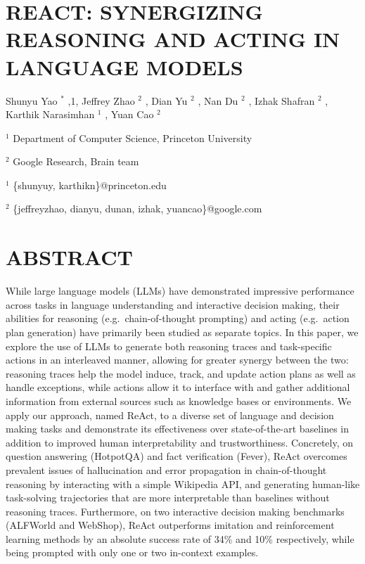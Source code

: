 \documentclass[
]{article}
\author{}
\date{}
\begin{document}
\section{REACT: SYNERGIZING REASONING AND ACTING IN LANGUAGE
MODELS}\label{react-synergizing-reasoning-and-acting-in-language-models}

Shunyu Yao \(^{*}\) ,1, Jeffrey Zhao \(^{2}\) , Dian Yu \(^{2}\) , Nan
Du \(^{2}\) , Izhak Shafran \(^{2}\) , Karthik Narasimhan \(^{1}\) ,
Yuan Cao \(^{2}\)

\(^{1}\) Department of Computer Science, Princeton University

\(^{2}\) Google Research, Brain team

\(^{1}\) \{shunyuy, karthikn\}@princeton.edu

\(^{2}\) \{jeffreyzhao, dianyu, dunan, izhak, yuancao\}@google.com

\section{ABSTRACT}\label{abstract}

While large language models (LLMs) have demonstrated impressive
performance across tasks in language understanding and interactive
decision making, their abilities for reasoning (e.g.~chain-of-thought
prompting) and acting (e.g.~action plan generation) have primarily been
studied as separate topics. In this paper, we explore the use of LLMs to
generate both reasoning traces and task-specific actions in an
interleaved manner, allowing for greater synergy between the two:
reasoning traces help the model induce, track, and update action plans
as well as handle exceptions, while actions allow it to interface with
and gather additional information from external sources such as
knowledge bases or environments. We apply our approach, named ReAct, to
a diverse set of language and decision making tasks and demonstrate its
effectiveness over state-of-the-art baselines in addition to improved
human interpretability and trustworthiness. Concretely, on question
answering (HotpotQA) and fact verification (Fever), ReAct overcomes
prevalent issues of hallucination and error propagation in
chain-of-thought reasoning by interacting with a simple Wikipedia API,
and generating human-like task-solving trajectories that are more
interpretable than baselines without reasoning traces. Furthermore, on
two interactive decision making benchmarks (ALFWorld and WebShop), ReAct
outperforms imitation and reinforcement learning methods by an absolute
success rate of 34\% and 10\% respectively, while being prompted with
only one or two in-context examples.
\end{document}
